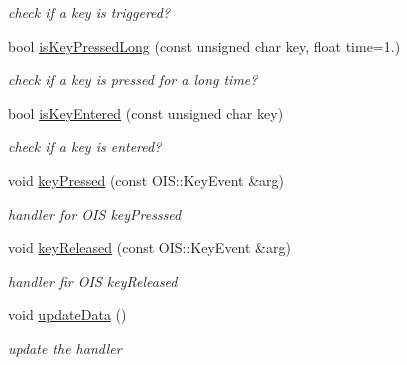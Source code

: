 \begin{DoxyCompactItemize}
\begin{DoxyCompactList}\small\item\em check if a key is triggered? \end{DoxyCompactList}\item 
bool \hyperlink{class_key_board_handler_ac34388fcd867aac71556626b307a4a6a}{is\+Key\+Pressed\+Long} (const unsigned char key, float time=1.)\hypertarget{class_key_board_handler_ac34388fcd867aac71556626b307a4a6a}{}\label{class_key_board_handler_ac34388fcd867aac71556626b307a4a6a}

\begin{DoxyCompactList}\small\item\em check if a key is pressed for a long time? \end{DoxyCompactList}\item 
bool \hyperlink{class_key_board_handler_a47e6d7e17b07ce2c8b422be62331997e}{is\+Key\+Entered} (const unsigned char key)\hypertarget{class_key_board_handler_a47e6d7e17b07ce2c8b422be62331997e}{}\label{class_key_board_handler_a47e6d7e17b07ce2c8b422be62331997e}

\begin{DoxyCompactList}\small\item\em check if a key is entered? \end{DoxyCompactList}\item 
void \hyperlink{class_key_board_handler_a188044605994c92b1a1bed5f3d1137f7}{key\+Pressed} (const O\+I\+S\+::\+Key\+Event \&arg)\hypertarget{class_key_board_handler_a188044605994c92b1a1bed5f3d1137f7}{}\label{class_key_board_handler_a188044605994c92b1a1bed5f3d1137f7}

\begin{DoxyCompactList}\small\item\em handler for O\+IS key\+Presssed \end{DoxyCompactList}\item 
void \hyperlink{class_key_board_handler_ac32dcdc6731d458aa8f557e723ed9d5f}{key\+Released} (const O\+I\+S\+::\+Key\+Event \&arg)\hypertarget{class_key_board_handler_ac32dcdc6731d458aa8f557e723ed9d5f}{}\label{class_key_board_handler_ac32dcdc6731d458aa8f557e723ed9d5f}

\begin{DoxyCompactList}\small\item\em handler fir O\+IS key\+Released \end{DoxyCompactList}\item 
void \hyperlink{class_key_board_handler_a89ccbbf5404145cadec192a0f044b34d}{update\+Data} ()\hypertarget{class_key_board_handler_a89ccbbf5404145cadec192a0f044b34d}{}\label{class_key_board_handler_a89ccbbf5404145cadec192a0f044b34d}

\begin{DoxyCompactList}\small\item\em update the handler \end{DoxyCompactList}\end{DoxyCompactItemize}


